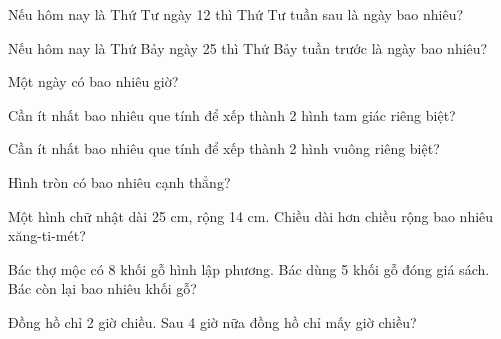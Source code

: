 \begin{ex}
Nếu hôm nay là Thứ Tư ngày 12 thì Thứ Tư tuần sau là ngày bao nhiêu?
\end{ex}

\begin{ex}
Nếu hôm nay là Thứ Bảy ngày 25 thì Thứ Bảy tuần trước là ngày bao nhiêu?
\end{ex}

\begin{ex}
Một ngày có bao nhiêu giờ?
\end{ex}

\begin{ex}
Cần ít nhất bao nhiêu que tính để xếp thành 2 hình tam giác riêng biệt?
\end{ex}

\begin{ex}
Cần ít nhất bao nhiêu que tính để xếp thành 2 hình vuông riêng biệt?
\end{ex}

\begin{ex}
Hình tròn có bao nhiêu cạnh thẳng?
\end{ex}

\begin{ex}
Một hình chữ nhật dài 25 cm, rộng 14 cm. Chiều dài hơn chiều rộng bao nhiêu xăng-ti-mét?
\end{ex}

\begin{ex}
Bác thợ mộc có 8 khối gỗ hình lập phương. Bác dùng 5 khối gỗ đóng giá sách. Bác còn lại bao nhiêu khối gỗ?
\end{ex}

\begin{ex}
Đồng hồ chỉ 2 giờ chiều. Sau 4 giờ nữa đồng hồ chỉ mấy giờ chiều?
\end{ex}

